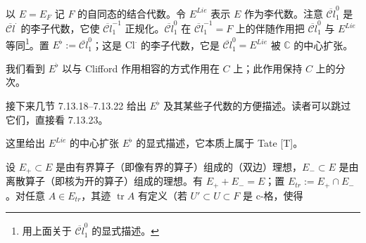 以 $E=E_F$ 记 $F$ 的自同态的结合代数。令 $E^{Lie}$ 表示 $E$ 作为李代数。注意 $\overline{\mathcal{C}l}^{0}_1$ 是 $\overline{\mathcal{C}l}^{\cdot}$ 的李子代数，它使 $\overline{\mathcal{C}l}^{-1}_1$ 正规化。$\overline{\mathcal{C}l}^{0}_1$ 在 $\overline{\mathcal{C}l}^{-1}_1=F$ 上的伴随作用把 $\overline{\mathcal{C}l}^{0}_1$ 与 $E^{Lie}$ 等同\footnote{用上面关于 $\overline{\mathcal{C}l}^{0}_1$ 的显式描述。}。置 $E^{\flat}:=\overline{\mathcal{C}l}^{0}_1$；这是 $\mathrm{Cl}^{\cdot}$ 的李子代数，它是 $\overline{\mathcal{C}l}^{0}_1=E^{Lie}$ 被 $\mathbb{C}$ 的中心扩张。

我们看到 $E^{\flat}$ 以与 Clifford 作用相容的方式作用在 $C$ 上；此作用保持 $C$ 上的分次。

接下来几节 7.13.18--7.13.22 给出 $E^{\flat}$ 及其某些子代数的方便描述。读者可以跳过它们，直接看 7.13.23。

 这里给出 $E^{Lie}$ 的中心扩张 $E^{\flat}$ 的显式描述，它本质上属于 Tate [T]。

设 $E_+\subset E$ 是由有界算子（即像有界的算子）组成的（双边）理想，$E_-\subset E$ 是由离散算子（即核为开的算子）组成的理想。有 $E_++E_-=E$；置 $E_{tr}:=E_+\cap E_-$。对任意 $A\in E_{tr}$，其迹 $\operatorname{tr}A$ 有定义（若 $U'\subset U\subset F$ 是 c-格，使得
